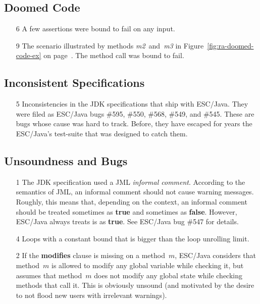 \documentclass[a4paper]{article}
\newcommand{\escjava}{ESC\slash Java\xspace}
\theoremstyle{slanted}
\theoremstyle{definition}
\theoremstyle{remark}
\begin{document}
\subsection{Doomed Code}

\begin{itemize}
\item[6] A few assertions were bound to fail on any input.
\item[9]
  The scenario illustrated by methods \textit{m2}~and~\textit{m3}
  in Figure~\ref{fig:ra-doomed-code-ex} on
  page~\pageref{fig:ra-doomed-code-ex}. The method call
  was bound to fail.
\end{itemize}

\subsection{Inconsistent Specifications}

\begin{itemize}
\item[5] 
  Inconsistencies in the JDK specifications that ship with
  \escjava. They were filed as \escjava bugs \#595, \#550, \#568,
  \#549, and \#545. These are bugs whose cause was hard to track.
  Before, they have escaped for years the \escjava's test-suite 
  that was designed to catch them.
\end{itemize}

\subsection{Unsoundness and Bugs}

\begin{itemize}
\item[1]
  The JDK specification used a JML \emph{informal comment}.
  According to the semantics of JML, an informal comment should
  not cause warning messages. Roughly, this means that, depending
  on the context, an informal comment should be treated sometimes
  as \textbf{true} and sometimes as \textbf{false}. However,
  \escjava always treats is as \textbf{true}. See \escjava bug
  \#547 for details.
\item[4]
  Loops with a constant bound that is bigger than the loop 
  unrolling limit.
\item[2]
  If the \textbf{modifies} clause is missing on a method~$m$,
  \escjava considers that method~$m$ is allowed to modify any
  global variable while checking it, but assumes that method~$m$
  does not modify any global state while checking methods that
  call it. This is obviously unsound (and motivated by the desire
  to not flood new users with irrelevant warnings).
\end{itemize}
\end{document}
